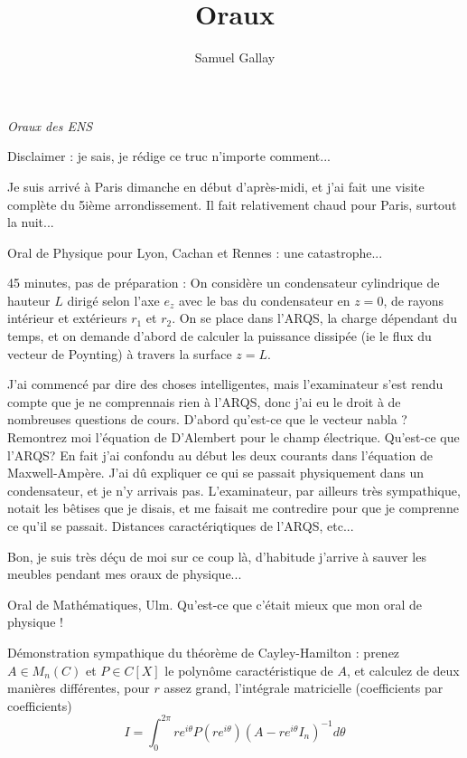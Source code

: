 \documentclass[french,a4paper, 12pt]{article}
\title{Oraux}
\author{Samuel Gallay}
\begin{document}
\maketitle

\emph{Oraux des ENS}

\vspace{5px}

Disclaimer : je sais, je rédige ce truc n'importe comment...

\vspace{5px}

Je suis arrivé à Paris dimanche en début d'après-midi, et j'ai fait une visite complète du 5ième arrondissement. Il fait relativement chaud pour Paris, surtout la nuit...

\vspace{5px}

Oral de Physique pour Lyon, Cachan et Rennes : une catastrophe...

45 minutes, pas de préparation : On considère un condensateur cylindrique de hauteur $L$ dirigé selon l'axe $e_z$ avec le bas du condensateur en $z = 0$, de rayons intérieur et extérieurs $r_1$ et $r_2$. On se place dans l'ARQS, la charge dépendant du temps, et on demande d'abord de calculer la puissance dissipée (ie le flux du vecteur de Poynting) à travers la surface $z = L$.

J'ai commencé par dire des choses intelligentes, mais l'examinateur s'est rendu compte que je ne comprennais rien à l'ARQS, donc j'ai eu le droit à de nombreuses questions de cours. D'abord qu'est-ce que le vecteur nabla ? Remontrez moi l'équation de D'Alembert pour le champ électrique. Qu'est-ce que l'ARQS? En fait j'ai confondu au début  les deux courants dans l'équation de Maxwell-Ampère. J'ai dû expliquer ce qui se passait physiquement dans un condensateur, et je n'y arrivais pas. L'examinateur, par ailleurs très sympathique, notait les bêtises que je disais, et me faisait me contredire pour que je comprenne ce qu'il se passait. Distances caractériqtiques de l'ARQS, etc...

Bon, je suis très déçu de moi sur ce coup là, d'habitude j'arrive à sauver les meubles pendant mes oraux de physique...

\vspace{5px}

Oral de Mathématiques, Ulm. Qu'est-ce que c'était mieux que mon oral de physique !

Démonstration sympathique du théorème de Cayley-Hamilton : prenez $A \in M_n(C)$ et $P\in C[X]$ le polynôme caractéristique de $A$, et calculez de deux manières différentes, pour $r$ assez grand, l'intégrale matricielle (coefficients par coefficients) $$I = \int_0^{2\pi} r e^{i\theta}P(re^{i\theta})(A-re^{i\theta}I_n)^{-1}d\theta$$ 
\end{document}
